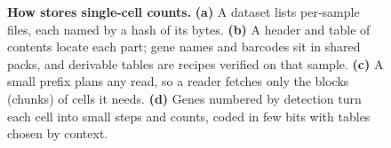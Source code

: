 \begin{figure}[tbp]
\caption{\textbf{How \sone{} stores single-cell counts.}
\textbf{(a)} A dataset lists per-sample files, each named by a hash of its bytes.
\textbf{(b)} A header and table of contents locate each part; gene names and barcodes sit in shared packs, and
derivable tables are recipes verified on that sample.
\textbf{(c)} A small prefix plans any read, so a reader fetches only the blocks (chunks) of cells it needs.
\textbf{(d)} Genes numbered by detection turn each cell into small steps and counts, coded in few bits with tables
chosen by context.}
\label{fig:how}
\end{figure}
